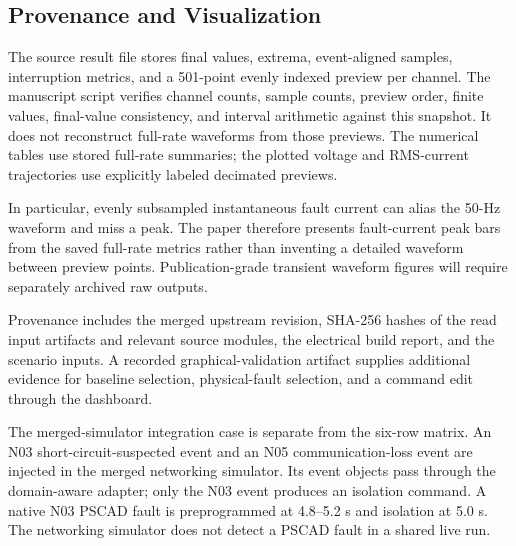 \subsection{Provenance and Visualization}
The source result file stores final values, extrema, event-aligned samples,
interruption metrics, and a 501-point evenly indexed preview per channel.
The manuscript script verifies channel counts, sample counts, preview order,
finite values, final-value consistency, and interval arithmetic against this
snapshot. It does not reconstruct full-rate waveforms from those previews.
The numerical tables use stored full-rate summaries; the plotted voltage and
RMS-current trajectories use explicitly labeled decimated previews.

In particular, evenly subsampled instantaneous fault current can alias the
50-Hz waveform and miss a peak. The paper therefore presents fault-current
peak bars from the saved full-rate metrics rather than inventing a detailed
waveform between preview points. Publication-grade transient waveform figures
will require separately archived raw outputs.

Provenance includes the merged upstream revision, SHA-256 hashes of the
read input artifacts and relevant source modules, the electrical build report,
and the scenario inputs. A recorded graphical-validation artifact supplies
additional evidence for baseline selection, physical-fault selection, and a
command edit through the dashboard.

The merged-simulator integration case is separate from the six-row matrix.
An N03 short-circuit-suspected event and an N05 communication-loss event are
injected in the merged networking simulator. Its event objects pass through
the domain-aware adapter; only the N03 event produces an isolation command.
A native N03 PSCAD fault is preprogrammed at 4.8--5.2 s and isolation at 5.0 s.
The networking simulator does not detect a PSCAD fault in a shared live run.
